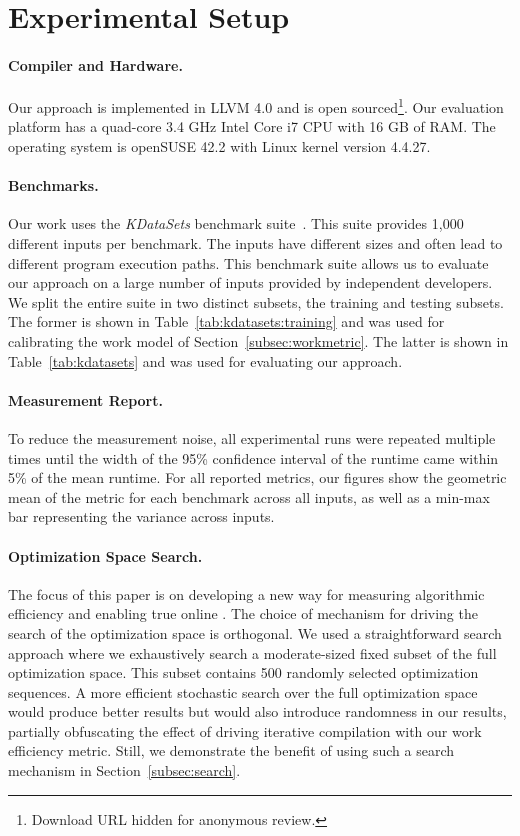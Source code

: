 \section{Experimental Setup}\label{sec:setup}

\paragraph{Compiler and Hardware.}
Our approach is implemented in LLVM 4.0 and is open sourced\footnote{Download URL hidden for anonymous review.}. Our evaluation platform has
a quad-core 3.4 GHz Intel Core i7 CPU with 16 GB of RAM. The operating system is openSUSE 42.2 with Linux kernel version 4.4.27.

\paragraph{Benchmarks.}
Our work uses the \textit{KDataSets} benchmark suite~\cite{chen10,chen12a}. This suite provides 1,000 different inputs per benchmark. The
inputs have different sizes and often lead to different program execution paths. This benchmark suite allows us to evaluate our approach on
a large number of inputs provided by independent developers. We split the entire suite in two distinct subsets, the training and testing
subsets. The former is shown in Table~\ref{tab:kdatasets:training} and was used for calibrating the work model of
Section~\ref{subsec:workmetric}. The latter is shown in Table~\ref{tab:kdatasets} and was used for evaluating our approach.



\paragraph{Measurement Report.}
To reduce the measurement noise, all experimental runs were repeated multiple times until the width of the 95\% confidence interval of the
runtime came within 5\% of the mean runtime. For all reported metrics, our figures show the geometric mean of the metric for each benchmark
across all inputs, as well as a min-max bar representing the variance across inputs.

\paragraph{Optimization Space Search.}

The focus of this paper is on developing a new way for measuring algorithmic efficiency and enabling true online {\itercomp}. The choice of
mechanism for driving the search of the optimization space is orthogonal. We used a straightforward search approach where we exhaustively
search a moderate-sized fixed subset of the full optimization space. This subset contains 500 randomly selected optimization sequences. A
more efficient stochastic search over the full optimization space would produce better results but would also introduce randomness in our
results, partially obfuscating the effect of driving iterative compilation with our work efficiency metric. Still, we demonstrate the
benefit of using such a search mechanism in Section~\ref{subsec:search}.


